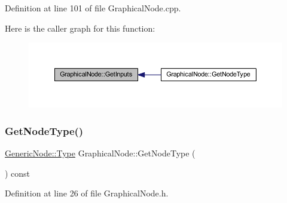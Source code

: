 Definition at line 101 of file Graphical\+Node.\+cpp.

Here is the caller graph for this function\+:
\nopagebreak
\begin{figure}[H]
\begin{center}
\leavevmode
\includegraphics[width=350pt]{class_graphical_node_a338a09b81d0be860210659f312fd5347_icgraph}
\end{center}
\end{figure}
\mbox{\label{class_graphical_node_a4c5493ddcfca4d433421ae06eac1b19a}} 
\subsubsection{\texorpdfstring{Get\+Node\+Type()}{GetNodeType()}}
{\footnotesize\ttfamily \hyperlink{class_generic_node_a9e7985ab9bbfa1c85091adc0ab71a6b6}{Generic\+Node\+::\+Type} Graphical\+Node\+::\+Get\+Node\+Type (\begin{DoxyParamCaption}{ }\end{DoxyParamCaption}) const\hspace{0.3cm}{\ttfamily [inline]}}



Definition at line 26 of file Graphical\+Node.\+h.

